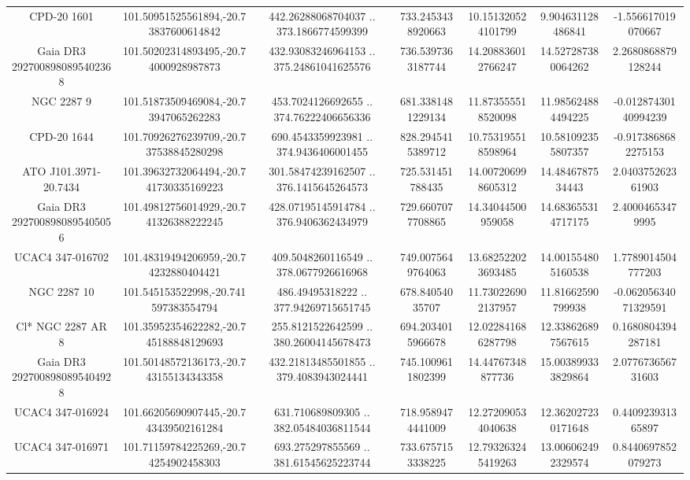\begin{table}
\begin{tabular}{ccccccc}
CPD-20  1601 & 101.50951525561894,-20.73837600614842 & 442.26288068704037 .. 373.1866774599399 & 733.2453438920663 & 10.151320524101799 & 9.904631128486841 & -1.556617019070667 \\
Gaia DR3 2927008980895402368 & 101.50202314893495,-20.74000928987873 & 432.93083246964153 .. 375.24861041625576 & 736.5397363187744 & 14.208836012766247 & 14.527287380064262 & 2.2680868879128244 \\
NGC  2287     9 & 101.51873509469084,-20.73947065262283 & 453.7024126692655 .. 374.76222406656336 & 681.3381481229134 & 11.873555518520098 & 11.985624884494225 & -0.01287430140994239 \\
CPD-20  1644 & 101.70926276239709,-20.737538845280298 & 690.4543359923981 .. 374.9436406001455 & 828.2945415389712 & 10.753195518598964 & 10.581092355807357 & -0.9173868682275153 \\
ATO J101.3971-20.7434 & 101.39632732064494,-20.741730335169223 & 301.58474239162507 .. 376.1415645264573 & 725.531451788435 & 14.007206998605312 & 14.4846787534443 & 2.040375262361903 \\
Gaia DR3 2927008980895405056 & 101.49812756014929,-20.741326388222245 & 428.07195145914784 .. 376.9406362434979 & 729.6607077708865 & 14.34044500959058 & 14.683655314717175 & 2.40004653479995 \\
UCAC4 347-016702 & 101.48319494206959,-20.74232880404421 & 409.5048260116549 .. 378.0677926616968 & 749.0075649764063 & 13.682522023693485 & 14.001554805160538 & 1.7789014504777203 \\
NGC  2287    10 & 101.545153522998,-20.741597383554794 & 486.49495318222 .. 377.94269715651745 & 678.84054035707 & 11.730226902137957 & 11.81662590799938 & -0.06205634071329591 \\
Cl* NGC 2287     AR       8 & 101.35952354622282,-20.745188848129693 & 255.8121522642599 .. 380.26004145678473 & 694.2034015966678 & 12.022841686287798 & 12.338626897567615 & 0.1680804394287181 \\
Gaia DR3 2927008980895404928 & 101.50148572136173,-20.743155134343358 & 432.21813485501855 .. 379.4083943024441 & 745.1009611802399 & 14.44767348877736 & 15.003899333829864 & 2.077673656731603 \\
UCAC4 347-016924 & 101.66205690907445,-20.743439502161284 & 631.710689809305 .. 382.05484036811544 & 718.9589474441009 & 12.272090534040638 & 12.362027230171648 & 0.440923931365897 \\
UCAC4 347-016971 & 101.71159784225269,-20.74254902458303 & 693.275297855569 .. 381.61545625223744 & 733.6757153338225 & 12.793263245419263 & 13.006062492329574 & 0.8440697852079273 \\

\end{tabular}
\end{table}
